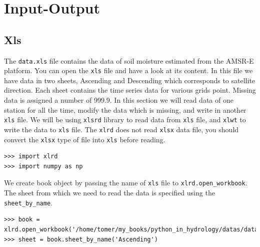 \documentclass[10pt]{book}
\begin{document}
\chapter{Input-Output}
\section{Xls}
The \verb"data.xls" file contains the data of soil moisture estimated from the AMSR-E platform. You can open the \verb"xls" file and have a look at its content. In this file we have data in two sheets, Ascending and Descending which corresponds to satellite direction. Each sheet contains the time series data for various grids point. Missing data is assigned a number of 999.9. In this section we will read data of one station for all the time, modify the data which is missing, and write in another \verb"xls" file. We will be using \verb"xlsrd" library to read data from \verb"xls" file, and \verb"xlwt" to write the data to \verb"xls" file. The \verb"xlrd" does not read \verb"xlsx" data file, you should convert the \verb"xlsx" type of file into \verb"xls" before reading.

\beforeverb \begin{verbatim}
>>> import xlrd
>>> import numpy as np
\end{verbatim} \afterverb

We create book object by passing the name of \verb"xls" file to \verb"xlrd.open_workbook". The sheet from which we need to read the data is specified using the \verb"sheet_by_name".  
\beforeverb \begin{verbatim}
>>> book = xlrd.open_workbook('/home/tomer/my_books/python_in_hydrology/datas/data.xls')
>>> sheet = book.sheet_by_name('Ascending')
\end{verbatim} \afterverb
\end{document}
